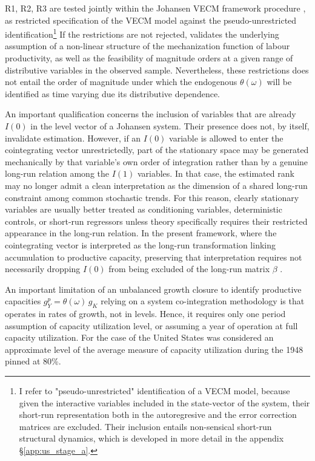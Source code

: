 \documentclass[11pt,a4paper]{article}
\begin{document}
{R1, R2, R3 are tested jointly within the Johansen VECM framework procedure
\citep{Johansen1991}, as restricted specification of the VECM model against the pseudo-unrestricted identification\footnote{I refer to "pseudo-unrestricted" identification of a VECM model, because given the interactive variables included in the state-vector of the system, their short-run representation both in the autoregresive and the error correction matrices are excluded. Their inclusion entails non-sensical short-run structural dynamics, which is developed in more detail in the appendix \S \ref{app:us_stage_a}.} If the restrictions are not rejected, validates the underlying assumption of a non-linear structure of the mechanization function of labour productivity, as well as the feasibility of magnitude orders at a given range of distributive variables in the observed sample. Nevertheless, these restrictions does not entail the order of magnitude under which the endogenous $\theta(\omega)$ will be identified as time varying due its distributive dependence.

An important qualification concerns the inclusion of variables that are already \(I(0)\)  in the level vector of a Johansen system. Their presence does not, by itself, invalidate estimation. However, if an \(I(0)\) variable is allowed to enter the cointegrating vector unrestrictedly, part of the stationary space may be generated mechanically by that variable’s own order of integration rather than by a genuine long-run relation among the \(I(1)\) variables. In that case, the estimated rank may no longer admit a clean interpretation as the dimension of a shared long-run constraint among common stochastic trends. For this reason, clearly stationary variables are usually better treated as conditioning variables, deterministic controls, or short-run regressors unless theory specifically requires their restricted appearance in the long-run relation. In the present framework, where the cointegrating vector is interpreted as the long-run transformation linking accumulation to productive capacity, preserving that interpretation requires not necessarily dropping \(I(0)\) from being excluded of the long-run matrix \(\beta\) \citep{ReinselVelChen2022}.

An important limitation of an unbalanced growth closure to identify productive capacities $g_Y^p=\theta(\omega) \, g_K$ relying on a system co-integration methodology is that operates in rates of growth, not in levels. Hence, it requires only one period assumption of capacity utilization level, or assuming a year of operation at full capacity utilization. For the case of the United States was considered  an approximate level of the average measure of capacity utilization during the 1948 pinned at 80\%. 


}
\end{document}

